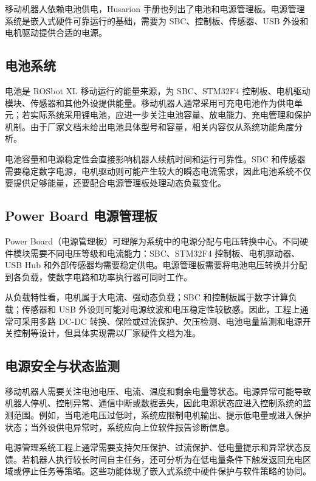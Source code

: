 \documentclass[UTF8,a4paper,12pt]{ctexrep}
\begin{document}
移动机器人依赖电池供电，Husarion 手册也列出了电池和电源管理板。电源管理系统是嵌入式硬件可靠运行的基础，需要为 SBC、控制板、传感器、USB 外设和电机驱动提供合适的电源。

\subsection{电池系统}

电池是 ROSbot XL 移动运行的能量来源，为 SBC、STM32F4 控制板、电机驱动模块、传感器和其他外设提供能量。移动机器人通常采用可充电电池作为供电单元；若实际系统采用锂电池，应进一步关注电池容量、放电能力、充电管理和保护机制。由于厂家文档未给出电池具体型号和容量，相关内容仅从系统功能角度分析。

电池容量和电源稳定性会直接影响机器人续航时间和运行可靠性。SBC 和传感器需要稳定数字电源，电机驱动则可能产生较大的瞬态电流需求，因此电池系统不仅要提供足够能量，还要配合电源管理板处理动态负载变化。

\subsection{Power Board 电源管理板}

Power Board（电源管理板）可理解为系统中的电源分配与电压转换中心。不同硬件模块需要不同电压等级和电流能力：SBC、STM32F4 控制板、电机驱动器、USB Hub 和外部传感器均需要稳定供电。电源管理板需要将电池电压转换并分配到各负载，使数字电路和功率执行器可同时工作。

从负载特性看，电机属于大电流、强动态负载；SBC 和控制板属于数字计算负载；传感器和 USB 外设则可能对电源纹波和电压稳定性较敏感。因此，工程上通常可采用多路 DC-DC 转换、保险或过流保护、欠压检测、电池电量监测和电源开关控制等设计，但具体实现需以厂家硬件文档为准。

\subsection{电源安全与状态监测}

移动机器人需要关注电池电压、电流、温度和剩余电量等状态。电源异常可能导致机器人停机、控制异常、通信中断或数据丢失，因此电源状态应进入控制系统的监测范围。例如，当电池电压过低时，系统应限制电机输出、提示低电量或进入保护状态；当外设供电异常时，系统应向上位软件报告诊断信息。

电源管理系统工程上通常需要支持欠压保护、过流保护、低电量提示和异常状态反馈。若机器人执行较长时间自主任务，还可分析为在低电量条件下触发返回充电区域或停止任务等策略。这些功能体现了嵌入式系统中硬件保护与软件策略的协同。
\end{document}
